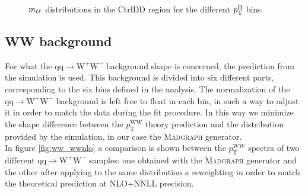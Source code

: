 \begin{figure}[htb]
\caption{$m_{\ell\ell}$ distributions in the CtrlDD region for the different $p_\mathrm{T}^\mathrm{H}$ bins.\label{fig:mllCtrlDD}}
\end{figure}

























\clearpage
\subsection{WW background \label{sec:WWBackground}}

For what the $\mathrm{qq\to W^{+}W^{-}}$ background shape is concerned, the prediction from the simulation is used.
This background is divided into six different parts, corresponding to the six \pth bins defined in the analysis. The normalization of the $\mathrm{qq\to W^{+}W^{-}}$ background is left free to float in each bin, in such a way to adjust it in order to match the data during the fit procedure. In this way we minimize the shape difference between the $p_\mathrm{T}^\mathrm{WW}$ theory prediction and the distribution provided by the simulation, in our case the \textsc{Madgraph} generator.\\
In figure \ref{fig:ww_wwnlo} a comparison is shown between the $p_\mathrm{T}^\mathrm{WW}$ spectra of two different $\mathrm{qq\to W^{+}W^{-}}$ samples: one obtained with the \textsc{Madgraph} generator and the other after applying to the same distribution a reweighting in order to match the theoretical prediction at NLO+NNLL precision.

